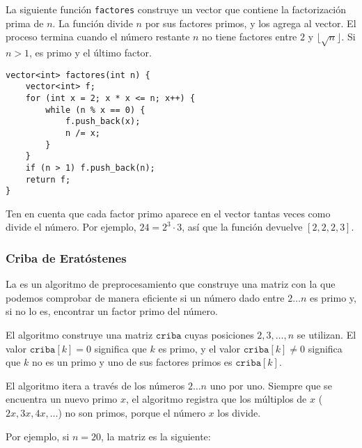 \noindent
La siguiente función \texttt{factores}
construye un vector que contiene la factorización
prima de $n$.
La función divide $n$ por sus factores primos,
y los agrega al vector.
El proceso termina cuando el número restante $n$
no tiene factores entre $2$ y $\lfloor \sqrt n \rfloor$.
Si $n>1$, es primo y el último factor.

\begin{lstlisting}
vector<int> factores(int n) {
    vector<int> f;
    for (int x = 2; x * x <= n; x++) {
        while (n % x == 0) {
            f.push_back(x);
            n /= x;
        }
    }
    if (n > 1) f.push_back(n);
    return f;
}
\end{lstlisting}

Ten en cuenta que cada factor primo aparece en el vector
tantas veces como divide el número.
Por ejemplo, $24=2^3 \cdot 3$,
así que la función devuelve $[2,2,2,3]$.

\subsubsection{Criba de Eratóstenes}


La 
es un algoritmo de preprocesamiento
que construye una matriz con la que podemos
comprobar de manera eficiente si un número dado entre $2 \ldots n$
es primo y, si no lo es, encontrar un factor primo del número.

El algoritmo construye una matriz $\texttt{criba}$
cuyas posiciones $2,3,\ldots,n$ se utilizan.
El valor $\texttt{criba}[k]=0$ significa
que $k$ es primo,
y el valor $\texttt{criba}[k] \neq 0$
significa que $k$ no es un primo y uno
de sus factores primos es $\texttt{criba}[k]$.

El algoritmo itera a través de los números
$2 \ldots n$ uno por uno.
Siempre que se encuentra un nuevo primo $x$,
el algoritmo registra que los múltiplos
de $x$ ($2x,3x,4x,\ldots$) no son primos,
porque el número $x$ los divide.

Por ejemplo, si $n=20$, la matriz es la siguiente:

